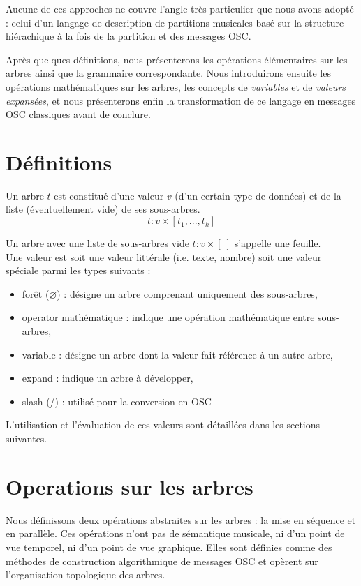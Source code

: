 \documentclass{article}
\newcommand{\llist}	[1]		{\ensuremath{[#1_1,...,#1_k]}}
\newcommand{\forest}	{\ensuremath{\varnothing}}
\newcommand{\emptyf}	{\ensuremath{[\ ]}}
\begin{document}
Aucune de ces approches ne couvre l'angle très particulier que nous avons adopté : celui d'un langage de description de partitions musicales basé sur la structure hiérachique à la fois de la partition et des messages OSC.

Après quelques définitions, nous présenterons les opérations élémentaires sur les arbres ainsi que la grammaire correspondante. Nous introduirons ensuite les opérations mathématiques sur les arbres, les concepts de \emph{variables} et de \emph{valeurs expansées}, et nous présenterons enfin la transformation de ce langage en messages OSC classiques avant de conclure.



\section{Définitions}

Un arbre $t$ est constitué d'une valeur $v$ (d'un certain type de données) et de la liste (éventuellement vide) de ses sous-arbres.
\[
	t :  v \times \llist{t} 
\]

Un arbre avec une liste de sous-arbres vide $t:v\times \emptyf$ s'appelle une feuille. \\
Une valeur est soit une valeur littérale (i.e. texte, nombre) soit une valeur spéciale parmi les types suivants :
\begin{itemize}
\item forêt (\forest) : désigne un arbre comprenant uniquement des sous-arbres,
\item operator mathématique : indique une opération mathématique entre sous-arbres,
\item variable : désigne un arbre dont la valeur fait référence à un autre arbre, 
\item expand : indique un arbre à développer,
\item slash (/) : utilisé pour la conversion en OSC
\end{itemize}
L'utilisation et l'évaluation de ces valeurs sont détaillées dans les sections suivantes.


\section{Operations sur les arbres}

Nous définissons deux opérations abstraites sur les arbres : la mise en séquence et en parallèle. Ces opérations n'ont pas de sémantique musicale, ni d'un point de vue temporel, ni d'un point de vue graphique. Elles sont définies comme des méthodes de construction algorithmique de messages OSC et opèrent sur l'organisation topologique des arbres. 
\end{document}
